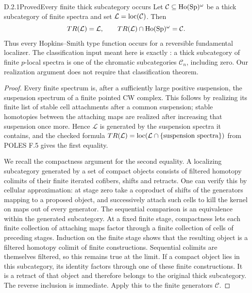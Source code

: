 


\begin{claim}{D.2.1}{Proved}{Every finite thick subcategory occurs}
Let $\mathcal C\subseteq\operatorname{Ho}(\mathrm{Sp})^\omega$ be a thick subcategory of finite spectra and set $\mathcal L=\operatorname{loc}(\mathcal C)$. Then
\[
 T R(\mathcal L)=\mathcal L,
 \qquad T R(\mathcal L)\cap\operatorname{Ho}(\mathrm{Sp})^\omega=\mathcal C.
\]
Thus every Hopkins--Smith type function occurs for a reversible fundamental localizer. The classification input meant here is exactly \citet[Theorem 7]{HopkinsSmith1998}: a thick subcategory of finite $p$-local spectra is one of the chromatic subcategories $\mathcal C_n$, including zero. Our realization argument does not require that classification theorem.
\end{claim}
\begin{proof}
Every finite spectrum is, after a sufficiently large positive suspension, the suspension spectrum of a finite pointed CW complex. This follows by realizing its finite list of stable cell attachments after a common suspension; stable homotopies between the attaching maps are realized after increasing that suspension once more. Hence $\mathcal L$ is generated by the suspension spectra it contains, and the checked formula $TR(\mathcal L)=\operatorname{loc}(\mathcal L\cap\{\text{suspension spectra}\})$ from POLES F.5 gives the first equality.

We recall the compactness argument for the second equality. A localizing subcategory generated by a set of compact objects consists of filtered homotopy colimits of their finite iterated cofibers, shifts and retracts. One can verify this by cellular approximation: at stage zero take a coproduct of shifts of the generators mapping to a proposed object, and successively attach such cells to kill the kernel on maps out of every generator. The sequential comparison is an equivalence within the generated subcategory. At a fixed finite stage, compactness lets each finite collection of attaching maps factor through a finite collection of cells of preceding stages. Induction on the finite stage shows that the resulting object is a filtered homotopy colimit of finite constructions. Sequential colimits are themselves filtered, so this remains true at the limit. If a compact object lies in this subcategory, its identity factors through one of these finite constructions. It is a retract of that object and therefore belongs to the original thick subcategory. The reverse inclusion is immediate. Apply this to the finite generators $\mathcal C$.
\end{proof}

